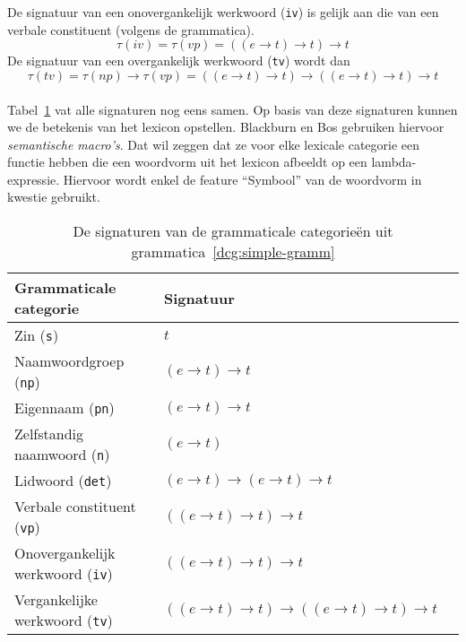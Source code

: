 De signatuur van een onovergankelijk werkwoord (\texttt{iv}) is gelijk aan die van een verbale constituent (volgens de grammatica). $$\tau(iv) = \tau(vp) = ((e \rightarrow t) \rightarrow t) \rightarrow t$$ De signatuur van een overgankelijk werkwoord (\texttt{tv}) wordt dan $$\tau(tv) = \tau(np) \rightarrow \tau(vp) = ((e \rightarrow t) \rightarrow t) \rightarrow ((e \rightarrow t) \rightarrow t) \rightarrow t$$

\paragraph{} Tabel~\ref{tbl:signaturen} vat alle signaturen nog eens samen. Op basis van deze signaturen kunnen we de betekenis van het lexicon opstellen. Blackburn en Bos gebruiken hiervoor \textit{semantische macro's}. Dat wil zeggen dat ze voor elke lexicale categorie een functie hebben die een woordvorm uit het lexicon afbeeldt op een lambda-expressie. Hiervoor wordt enkel de feature ``Symbool'' van de woordvorm in kwestie gebruikt.

\begin{table}[h]
  \begin{tabular}{@{}lll}
    \hline
    \textbf{Grammaticale categorie}             & \textbf{Signatuur} \\
    \hline 
    Zin (\texttt{s})                          & $t$ \\
    Naamwoordgroep (\texttt{np})              & $(e \rightarrow t) \rightarrow t$ \\
    Eigennaam (\texttt{pn})                   & $(e \rightarrow t) \rightarrow t$ \\
    Zelfstandig naamwoord (\texttt{n})        & $(e \rightarrow t)$ \\
    Lidwoord (\texttt{det})                   & $(e \rightarrow t) \rightarrow (e \rightarrow t) \rightarrow t$ \\
    Verbale constituent (\texttt{vp})         & $((e \rightarrow t) \rightarrow t) \rightarrow t$ \\
    Onovergankelijk werkwoord (\texttt{iv})   & $((e \rightarrow t) \rightarrow t) \rightarrow t$ \\
    Vergankelijke werkwoord (\texttt{tv})     & $((e \rightarrow t) \rightarrow t) \rightarrow ((e \rightarrow t) \rightarrow t) \rightarrow t$ \\
    \hline
  \end{tabular}
  \centering
  \caption{De signaturen van de grammaticale categorieën uit grammatica~\ref{dcg:simple-gramm}}
  \label{tbl:signaturen}
\end{table}

